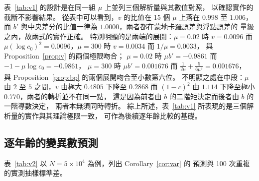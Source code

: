 \documentclass[UTF8, fontset=macnew, a4paper, 12pt]{ctexart}
\begin{document}
表~\ref{tab:v1} 的設計是在同一組 $\mu$ 上並列三個解析量與其數值對照，
以確認實作的截斷不影響結果。
從表中可以看到，$v$ 的比值在 15 個 $\mu$ 上落在 $0.998$ 至 $1.006$，
而 $b'$ 與中央差分的比值一律為 $1.0000$，兩者都在蒙地卡羅誤差與浮點誤差的
量級之內，故兩式的實作正確。
特別明顯的是兩端的展開：$\mu=0.02$ 時 $v=0.0096$ 而
$\mu(\log c_0)^2=0.0096$，$\mu=300$ 時 $v=0.0034$ 而 $1/\mu=0.0033$，
與 Proposition~\ref{prop:v} 的兩個極限吻合；
$\mu=0.02$ 時 $\mu b'=-0.9861$ 而 $-1-\mu\log c_0=-0.9861$，
$\mu=300$ 時 $\mu b'=0.001676$ 而 $\frac{1}{2\mu}+\frac{5}{6\mu^2}=0.001676$，
與 Proposition~\ref{prop:bp} 的兩個展開吻合至小數第六位。
不明顯之處在中段：$\mu$ 由 $2$ 至 $5$ 之間，$v$ 由極大 $0.4805$ 下降至
$0.2868$ 而 $(1-c)^2$ 由 $1.114$ 下降至極小 $0.770$，兩者的轉折並不在同一點，
這是因為前者由 $b$ 的二階矩決定而後者由 $b$ 的一階導數決定，
兩者本無須同時轉折。
綜上所述，表~\ref{tab:v1} 所表現的是三個解析量的實作與其理論極限一致，
可作為後續逐年齡比較的基礎。

\subsection{逐年齡的變異數預測}

表~\ref{tab:v2} 以 $N=5\times10^{4}$ 為例，列出 Corollary~\ref{cor:var} 的
預測與 100 次重複的實測抽樣標準差。
\end{document}

